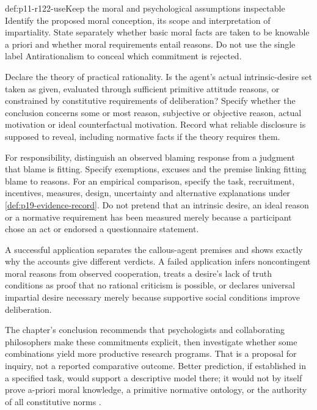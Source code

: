 \begin{hbmethod}{def:p11-r122-use}{Keep the moral and psychological assumptions inspectable}
Identify the proposed moral conception, its scope and interpretation of
impartiality. State separately whether basic moral facts are taken to
be knowable a priori and whether moral requirements entail reasons.
Do not use the single label Antirationalism to conceal which commitment
is rejected.

Declare the theory of practical rationality. Is the agent's actual
intrinsic-desire set taken as given, evaluated through sufficient
primitive attitude reasons, or constrained by constitutive requirements
of deliberation? Specify whether the conclusion concerns some or most
reason, subjective or objective reason, actual motivation or ideal
counterfactual motivation. Record what reliable disclosure is supposed
to reveal, including normative facts if the theory requires them.

For responsibility, distinguish an observed blaming response from a
judgment that blame is fitting. Specify exemptions, excuses and the
premise linking fitting blame to reasons. For an empirical comparison,
specify the task, recruitment, incentives, measures, design, uncertainty
and alternative explanations under \cref{def:p19-evidence-record}.
Do not pretend that an intrinsic desire, an ideal reason or a normative
requirement has been measured merely because a participant chose an act
or endorsed a questionnaire statement.

A successful application separates the callous-agent premises and shows
exactly why the accounts give different verdicts. A failed application
infers noncontingent moral reasons from observed cooperation, treats a
desire's lack of truth conditions as proof that no rational criticism
is possible, or declares universal impartial desire necessary merely
because supportive social conditions improve deliberation.
\end{hbmethod}

The chapter's conclusion recommends that psychologists and collaborating
philosophers make these commitments explicit, then investigate whether
some combinations yield more productive research programs. That is a
proposal for inquiry, not a reported comparative outcome. Better
prediction, if established in a specified task, would support a
descriptive model there; it would not by itself prove a-priori moral
knowledge, a primitive normative ontology, or the authority of all
constitutive norms \parencite[p.~700]{Smith2021MoralReasons}.

